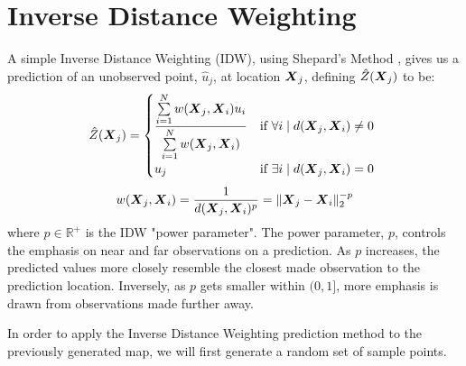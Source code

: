 \documentclass[11pt]{ucthesis}
\newcommand{\vect}[1]{{\it{\boldsymbol{#1}}}}
\begin{document}
\section{Inverse Distance Weighting}
A simple Inverse Distance Weighting (IDW), using Shepard's Method \cite{shepard:idw}, gives us a prediction of an unobserved point, $\hat{u}_j$, at location $\vect{X}_j$, defining $\hat{Z}(\vect{X}_j)$ to be:
\begin{equation}
	\hat{Z}(\vect{X}_j)=\begin{cases}
			\dfrac{\sum\limits_{i=1}^N w(\vect{X}_j, \vect{X}_i)u_i}{\sum\limits_{i=1}^{N} w(\vect{X}_j, \vect{X}_i)} & \text{if}\ \forall i \mid d(\vect{X}_j,\vect{X}_i) \neq 0\ \\
			u_j & \text{if}\ \exists i \mid d(\vect{X}_j,\vect{X}_i)=0\\
		\end{cases}
\end{equation}
\begin{equation}
	w(\vect{X}_j, \vect{X}_i)=\frac{1}{d(\vect{X}_j,\vect{X}_{i})^{p}}=\|\vect{X}_j-\vect{X}_i\|_{2}^{-p}
\end{equation}
where $p \in \mathbb{R}^{+}$ is the IDW "power parameter". The power parameter, $p$, controls the emphasis on near and far observations on a prediction. As $p$ increases, the predicted values more closely resemble the closest made observation to the prediction location. Inversely, as $p$ gets smaller within $(0, 1]$, more emphasis is drawn from observations made further away.

In order to apply the Inverse Distance Weighting prediction method to the previously generated map, we will first generate a random set of sample points.
\end{document}
